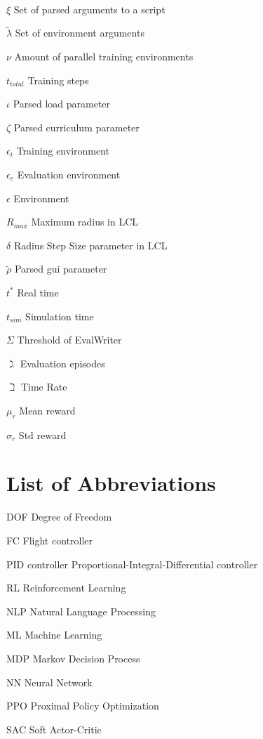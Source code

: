 \documentclass[bachelor,english]{infothesis}
\begin{document}
\begin{description}
	\\
	\item $\xi$ \dotfill Set of parsed arguments to a script
	\item $\tilde{\lambda}$ \dotfill Set of environment arguments
	\item $\nu$ \dotfill Amount of parallel training environments
	\item $t_{total}$ \dotfill Training steps
	\item $\iota$ \dotfill Parsed load parameter
	\item $\zeta$ \dotfill Parsed curriculum parameter
	\item  $\epsilon_t$ \dotfill Training environment
	\item $\epsilon_e$ \dotfill Evaluation environment
	\item $\epsilon$ \dotfill Environment
	\item $R_{max}$ \dotfill Maximum radius in LCL
	\item $\delta$ \dotfill Radius Step Size parameter in LCL
	\item $\tilde{\rho}$ \dotfill Parsed gui parameter
	\item $t^*$ \dotfill Real time
	\item  $t_{sim}$ \dotfill Simulation time
	\item $\Sigma$ \dotfill Threshold of EvalWriter
	\item $\gimel$ \dotfill Evaluation episodes
	\item $\beth$ \dotfill Time Rate
	\item $\mu_r$ \dotfill Mean reward
	\item $\sigma_r$ \dotfill Std reward
\end{description}

\chapter*{List of Abbreviations}

\begin{description}
	\item DOF \dotfill Degree of Freedom
	\item FC \dotfill Flight controller
	\item PID controller \dotfill Proportional-Integral-Differential controller
	\item RL \dotfill Reinforcement Learning
	\item NLP \dotfill Natural Language Processing
	\item ML \dotfill Machine Learning
	\item MDP \dotfill Markov Decision Process
	\item NN \dotfill Neural Network
	\item PPO \dotfill Proximal Policy Optimization
	\item SAC \dotfill Soft Actor-Critic
\end{description}


\clearpage


\end{document}
